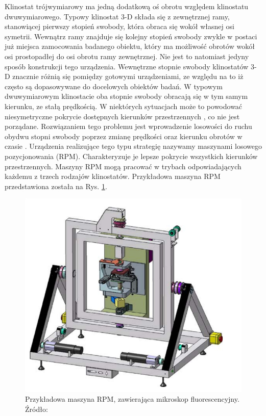 Klinostat trójwymiarowy ma jedną dodatkową oś obrotu względem klinostatu dwuwymiarowego.
 Typowy klinostat 3-D składa się z zewnętrznej ramy, stanowiącej pierwszy stopień
  swobody, która obraca się wokół własnej osi symetrii. Wewnątrz ramy znajduje się
   kolejny stopień swobody zwykle w postaci już miejsca zamocowania badanego obiektu,
    który ma możliwość obrotów wokół osi prostopadłej do osi obrotu ramy zewnętrznej.
     Nie jest to natomiast jedyny sposób konstrukcji tego urządzenia. Wewnętrzne stopnie
      swobody klinostatów 3-D znacznie różnią się pomiędzy gotowymi urządzeniami, ze
       względu na to iż często są dopasowywane do docelowych obiektów badań. W typowym
        dwuwymiarowym klinostacie oba stopnie swobody obracają się w tym samym kierunku,
         ze stałą prędkością. W niektórych sytuacjach może to powodować niesymetryczne
          pokrycie dostępnych kierunków przestrzennych \cite{bib:rpmy}, co nie jest
           porządane. Rozwiązaniem tego problemu jest wprowadzenie losowości do ruchu
            obydwu stopni swobody poprzez zmianę prędkości oraz kierunku obrotów w
             czasie \cite{bib:rpmy}. Urządzenia realizujące tego typu strategię nazywamy
              maszynami losowego pozycjonowania (RPM). Charakteryzuje je lepsze pokrycie
               wszystkich kierunków przestrzennych. Maszyny RPM mogą pracować w trybach
                odpowiadających każdemu z trzech rodzajów klinostatów. Przykładowa
                 maszyna RPM przedstawiona została na Rys. \ref{fig_rpm}.

\begin{figure}
	\centering
	\includegraphics[scale=0.5]{rpm}
	\caption{Przykładowa maszyna RPM, zawierająca mikroskop fluorescencyjny. Źródło: \cite{bib:rpmy}} 
	\label{fig_rpm}
\end{figure}

